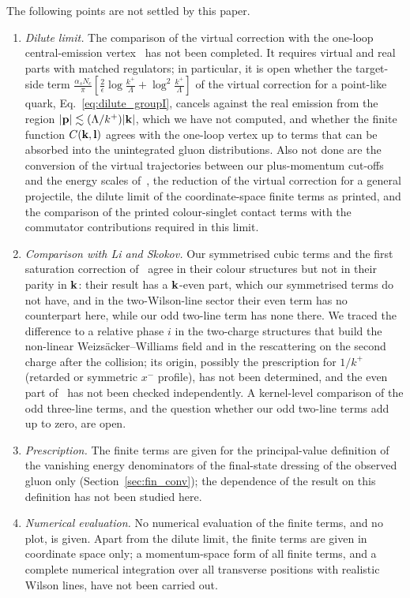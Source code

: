 The following points are not settled by this paper.
\begin{enumerate}
\item[(i)] \emph{Dilute limit.} The comparison of the virtual correction with the one-loop central-emission vertex~\cite{Fadin:1998py,DelDuca:1998cx,Bartels:2006hg} has not been completed. It requires virtual and real parts with matched regulators; in particular, it is open whether the target-side term $\frac{\alpha_sN_c}{\pi}[\frac2\epsilon\log\frac{k^+}{\Lambda}+\log^2\frac{k^+}{\Lambda}]$ of the virtual correction for a point-like quark, Eq.~\eqref{eq:dilute_groupI}, cancels against the real emission from the region $|\mathbf{p}|\lesssim(\Lambda/k^+)|\mathbf{k}|$, which we have not computed, and whether the finite function $C(\mathbf{k},\mathbf{l})$ agrees with the one-loop vertex up to terms that can be absorbed into the unintegrated gluon distributions. Also not done are the conversion of the virtual trajectories between our plus-momentum cut-offs and the energy scales of~\cite{Bartels:2006hg}, the reduction of the virtual correction for a general projectile, the dilute limit of the coordinate-space finite terms as printed, and the comparison of the printed colour-singlet contact terms with the commutator contributions required in this limit.
\item[(ii)] \emph{Comparison with Li and Skokov.} Our symmetrised cubic terms and the first saturation correction of~\cite{Li:2021ntm} agree in their colour structures but not in their parity in $\mathbf{k}$: their result has a $\mathbf{k}$-even part, which our symmetrised terms do not have, and in the two-Wilson-line sector their even term has no counterpart here, while our odd two-line term has none there. We traced the difference to a relative phase $i$ in the two-charge structures that build the non-linear Weizs\"acker--Williams field and in the rescattering on the second charge after the collision; its origin, possibly the prescription for $1/k^+$ (retarded or symmetric $x^-$ profile), has not been determined, and the even part of~\cite{Li:2021ntm} has not been checked independently. A kernel-level comparison of the odd three-line terms, and the question whether our odd two-line terms add up to zero, are open.
\item[(iii)] \emph{Prescription.} The finite terms are given for the principal-value definition of the vanishing energy denominators of the final-state dressing of the observed gluon only (Section~\ref{sec:fin_conv}); the dependence of the result on this definition has not been studied here.
\item[(iv)] \emph{Numerical evaluation.} No numerical evaluation of the finite terms, and no plot, is given. Apart from the dilute limit, the finite terms are given in coordinate space only; a momentum-space form of all finite terms, and a complete numerical integration over all transverse positions with realistic Wilson lines, have not been carried out.

\end{enumerate}
